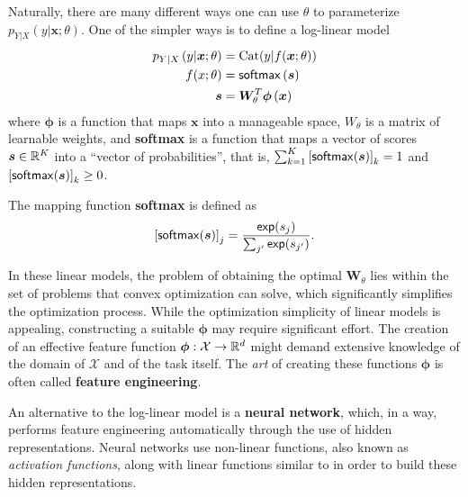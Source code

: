 \noindent Naturally, there are many different ways one can use $\theta$ to
parameterize $p_{Y|X}\left(y|\bm{x};\theta\right)$. One of the simpler ways
is to define a log-linear model
%
\begin{align}
    p_{Y|X}\left(y|\bm{x};\theta\right) & = \text{Cat}(y|f(\bm x; \theta)) \\
    f(x; \theta)                        & = \operatorname*{\mathsf{softmax}} \left(\bm{s}\right)   \\
    \bm{s}                              & 
    = \bm{W}_{\theta}^T\bm{\phi}\left(\bm{x}\right) \label{eq:linear}
\end{align}
%
where $\bm{\phi}$ is a function that maps $\bm{x}$ into a
manageable space, $W_{\theta}$ is a matrix of learnable weights, and
\textbf{softmax} is a function that maps a vector of scores $\bm{s}\in\mathbb{R}^K$ into
a ``vector of probabilities'', that is, $\sum_{k=1}^K\left[\operatorname*{\mathsf{softmax}}(\bm{s})\right]_k=1$
and $\left[\operatorname*{\mathsf{softmax}}(\bm{s})\right]_k \geq 0$.

\begin{definition}[softmax]
    The mapping function \textbf{softmax} is defined as
    \begin{equation}\label{eq:softmax}
        \left[\operatorname*{\mathsf{softmax}}(\bm{s})\right]_j = \frac{\operatorname*{\mathsf{exp}}(s_j)}{\sum_{j'} \operatorname*{\mathsf{exp}}(s_{j'})}.
    \end{equation}
\end{definition}

In these linear models, the problem of obtaining the optimal $\bm{W}_{\theta}$ lies
within the set of problems that convex optimization can solve, which
significantly simplifies the optimization process. While the
optimization simplicity of linear models is appealing, constructing a suitable
$\bm{\phi}$ may require significant effort. The creation of an
effective feature function $\bm{\phi}: \mathcal{X} \rightarrow \mathbb{R}^d$ might
demand extensive knowledge of the domain of $\mathcal{X}$ and of the
task itself. The \textit{art} of creating these functions $\bm{\phi}$
is often called \textbf{feature engineering}.

An alternative to the log-linear model is a \textbf{neural network}, which, in a
way, performs feature engineering automatically through the use of hidden
representations. Neural networks use non-linear functions, also known
as \textit{activation functions}, along with linear functions similar
to  in order to build these hidden representations.

